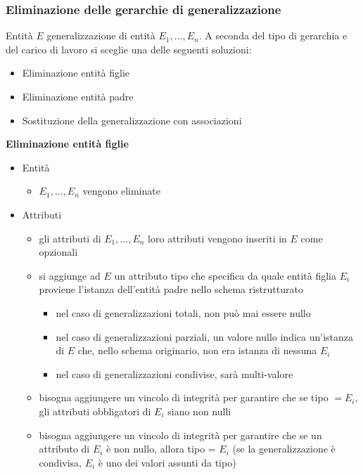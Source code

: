 \subsubsection{Eliminazione delle gerarchie di generalizzazione}
Entità $E$ generalizzazione di entità $E_1,...,E_n$. A seconda del tipo di gerarchia e del carico di lavoro si sceglie una delle seguenti soluzioni:
\begin{itemize}
    \item Eliminazione entità figlie
    \item Eliminazione entità padre
    \item Sostituzione della generalizzazione con associazioni
\end{itemize}
\newpage \noindent
\textbf{Eliminazione entità figlie}
\begin{itemize}
    \item Entità
    \begin{itemize}
        \item $E_1,...,E_n$ vengono eliminate
    \end{itemize}
    
    \item Attributi
    \begin{itemize}
        \item gli attributi di $E_1,...,E_n$ loro attributi vengono inseriti in $E$ come opzionali
        
        \item si aggiunge ad $E$ un attributo tipo che specifica da quale entità figlia $E_i$ proviene l’istanza dell'entità padre nello schema ristrutturato
        \begin{itemize}
            \item nel caso di generalizzazioni totali, non può mai essere nullo
            \item nel caso di generalizzazioni parziali, un valore nullo indica un'istanza di $E$ che, nello schema originario, non era istanza di nessuna $E_i$
            \item nel caso di generalizzazioni condivise, sarà multi-valore
        \end{itemize}
        
        \item bisogna aggiungere un vincolo di integrità per garantire che se tipo $= E_i$, gli attributi obbligatori di $E_i$ siano non nulli
        
        \item bisogna aggiungere un vincolo di integrità per garantire che se un
        attributo di $E_i$ è non nullo, allora tipo = $E_i$ (se la generalizzazione è
        condivisa, $E_i$ è uno dei valori assunti da tipo)
    \end{itemize}
    

\end{itemize}
